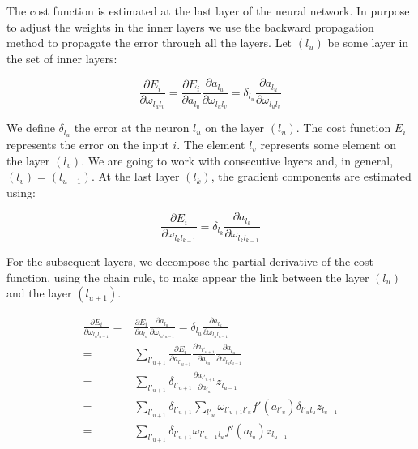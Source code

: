 \documentclass[final, paper=letter,5p,times,twocolumn]{elsarticle}
\begin{document}
The cost function is estimated at the last layer of the neural network. In purpose to adjust the weights in the inner layers we use the backward propagation method to propagate the error through all the layers. Let $(l_{u})$ be some layer in the set of inner layers:

\begin{equation*}
  \frac{\partial E_{i}}{\partial \omega_{l_{u}l_{v}}} = \frac{\partial E_{i}}{\partial a_{l_{u}}} \frac{\partial a_{l_{u}}}{\partial \omega_{l_{u}l_{v}}} = \delta_{l_{u}}\frac{\partial a_{l_{u}}}{\partial \omega_{l_{u}l_{v}}} 
\end{equation*}

We define $\delta_{l_{u}}$ the error at the neuron $l_{u}$ on the layer $(l_{u})$. The cost function $E_{i}$ represents the error on the input $i$. The element $l_{v}$ represents some element on the layer $(l_{v})$. We are going to work with consecutive layers and, in general, $(l_{v}) = (l_{u-1})$. At the last layer $(l_{k})$, the gradient components are estimated using:

\begin{equation}
  \frac{\partial E_{i}}{\partial \omega_{l_{k}l_{k-1}}} = \delta_{l_{k}}\frac{\partial a_{l_{k}}}{\partial \omega_{l_{k}l_{k-1}}} 
\label{eq:backprob_layer_k}
\end{equation}

For the subsequent layers, we decompose the partial derivative of the cost function, using the chain rule, to make appear the link between the layer $(l_{u})$ and the layer $(l_{u+1})$. 

\begin{equation}
  \begin{split}
    \frac{\partial E_{i}}{\partial \omega_{l_{u}l_{u-1}}} = &  \frac{\partial E_{i}}{\partial a_{l_{u}}} \frac{\partial a_{l_{u}}}{\partial \omega_{l_{u}l_{u-1}}} = \delta_{l_{u}} \frac{\partial a_{l_{u}}}{\partial \omega_{l_{u}l_{u-1}}}  \\
    = & \sum_{l'_{u+1}}\frac{\partial E_{i}}{\partial a_{l'_{u+1}}} \frac{\partial a_{l'_{u+1}}}{\partial a_{l_{u}}} \frac{\partial a_{l_{u}}}{\partial \omega_{l_{u}l_{u-1}}}   \\
    = & \sum_{l'_{u+1}} \delta_{l'_{u+1}} \frac{\partial a_{l'_{u+1}}}{\partial a_{l_{u}}} z_{l_{u-1}}   \\
    = & \sum_{l'_{u+1}} \delta_{l'_{u+1}} \sum_{l'_{u}} \omega_{l'_{u+1}l'_{u}} f'(a_{l'_{u}}) \delta_{l'_{u}l_{u}} z_{l_{u-1}}   \\
    = & \sum_{l'_{u+1}} \delta_{l'_{u+1}} \omega_{l'_{u+1}l_{u}} f'(a_{l_{u}}) z_{l_{u-1}}   \\
  \end{split}
\label{eq:backprob}
\end{equation}
\end{document}
